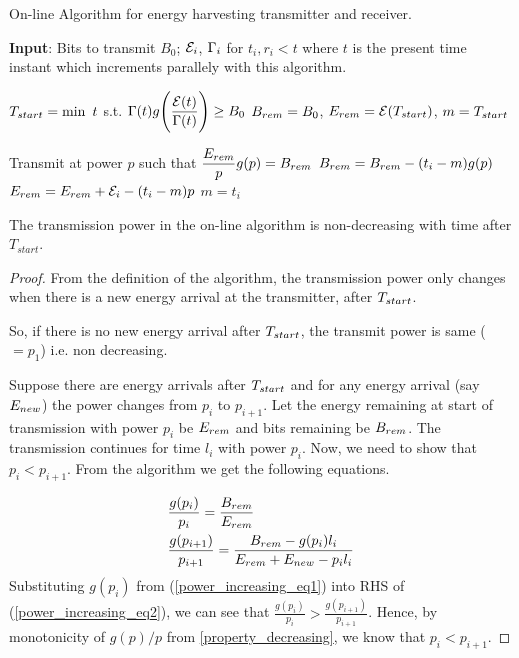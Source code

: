 \begin{algorithm}
\caption {On-line Algorithm for energy harvesting transmitter and receiver.}
\footnotesize
\label{algo_online}
\begin{algorithmic}[1]
\State \textbf{Input}: Bits to transmit $B_0$; $\mathcal{E}_i$, $\Gamma_i$ for $t_i,r_i<t$ where $t$ is the present time instant which increments parallely with this algorithm. 

\State $T_{\mbox{\scriptsize{start}}}=\min\ t$ s.t. $\Gamma(t)g\Bigg{(} \dfrac{\mathcal{E}(t)}{\Gamma(t)}\Bigg{)}\ge B_0$
\State $B_{\mbox{\scriptsize{rem}}}=B_0$, $E_{\mbox{\scriptsize{rem}}}=\ETx(T_{\mbox{\scriptsize{start}}})$, $m=T_{\mbox{\scriptsize{start}}}$

\Do
	\State Transmit at power $p$ such that $\dfrac{E_{\mbox{\scriptsize{rem}}}}{p} g(p)= B_{\mbox{\scriptsize{rem}}}$
		\State $B_{\mbox{\scriptsize{rem}}}=B_{\mbox{\scriptsize{rem}}}-(t_i-m)g(p)$
		\State $E_{\mbox{\scriptsize{rem}}}=E_{\mbox{\scriptsize{rem}}}+\ETx_i-(t_i-m)p$
		\State $m=t_i$
	\EndIf
{}
\end{algorithmic}
\end{algorithm}

\begin{lemma}
The transmission power in the on-line algorithm is non-decreasing with time after $T_{start}$.
\label{online_power}
\end{lemma}
\begin{proof}
From the definition of the algorithm, the transmission power only changes when there is a new energy arrival at the transmitter, after $T_{\mbox{\scriptsize{start}}}$. 

So, if there is no new energy arrival after $T_{\mbox{\scriptsize{start}}}$, the transmit power is same ($=p_1$) i.e. non decreasing. 

Suppose there are energy arrivals after $T_{\mbox{\scriptsize{start}}}$ and for any energy arrival (say $E_{\mbox{\scriptsize{new}}}$) the power changes from $p_i$ to $p_{i+1}$. Let the energy remaining at start of transmission with power $p_i$ be $E_{\mbox{\scriptsize{rem}}}$ and bits remaining be $B_{\mbox{\scriptsize{rem}}}$. The transmission continues for time $l_i$ with power $p_i$. Now, we need to show that $p_i<p_{i+1}$. From the algorithm we get the following equations.  

\begin{align}
&\frac{g(p_i)}{p_i}=\frac{B_{\mbox{\scriptsize{rem}}}}{E_{\mbox{\scriptsize{rem}}}} \label{power_increasing_eq1}
\\
&\frac{g(p_{i+1})}{p_{i+1}}=\frac{B_{\mbox{\scriptsize{rem}}}-g(p_i) l_i}{E_{\mbox{\scriptsize{rem}}}+E_{\mbox{\scriptsize{new}}}-p_i l_i}\label{power_increasing_eq2}
\end{align}
Substituting $g(p_i)$ from (\ref{power_increasing_eq1}) into RHS of (\ref{power_increasing_eq2}), we can see that $\frac{g(p_i)}{p_i}>\frac{g(p_{i+1})}{p_{i+1}}$. Hence, by monotonicity of $g(p)/p$ from \eqref{property_decreasing}, we know that $p_i<p_{i+1}$.
\end{proof}

